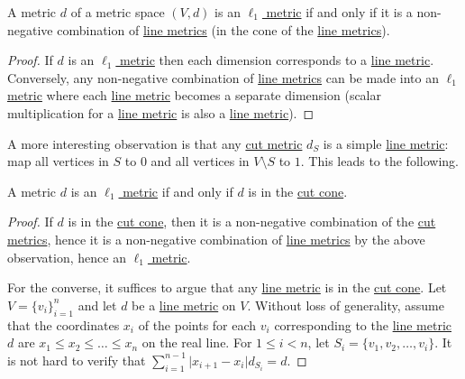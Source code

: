 \begin{lemma}\label{lma:l1-metric-iff-non-negative-combination-of-line-metric}
	A metric \(d\) of a metric space \((V, d)\) is an \hyperref[def:l1-metric]{\(\ell _1\) metric} if and only if it is a non-negative combination of \hyperref[def:line-metric]{line metrics} (in the cone of the \hyperref[def:line-metric]{line metrics}).
\end{lemma}
\begin{proof}
	If \(d\) is an \hyperref[def:l1-metric]{\(\ell _1\) metric} then each dimension corresponds to a \hyperref[def:line-metric]{line metric}. Conversely, any non-negative combination of \hyperref[def:line-metric]{line metrics} can be made into an \hyperref[def:l1-metric]{\(\ell _1\) metric} where each \hyperref[def:line-metric]{line metric} becomes a separate dimension (scalar multiplication for a \hyperref[def:line-metric]{line metric} is also a \hyperref[def:line-metric]{line metric}).
\end{proof}

A more interesting observation is that any \hyperref[def:cut-metric]{cut metric} \(d_S\) is a simple \hyperref[def:line-metric]{line metric}: map all vertices in \(S\) to \(0\) and all vertices in \(V \setminus S\) to \(1\). This leads to the following.

\begin{lemma}\label{lma:l1-metric-iff-cut-cone}
	A metric \(d\) is an \hyperref[def:l1-metric]{\(\ell _1\) metric} if and only if \(d\) is in the \hyperref[def:cut-cone]{cut cone}.
\end{lemma}
\begin{proof}
	If \(d\) is in the \hyperref[def:cut-cone]{cut cone}, then it is a non-negative combination of the \hyperref[def:cut-metric]{cut metrics}, hence it is a non-negative combination of \hyperref[def:line-metric]{line metrics} by the above observation, hence an \hyperref[def:l1-metric]{\(\ell _1\) metric}.

	For the converse, it suffices to argue that any \hyperref[def:line-metric]{line metric} is in the \hyperref[def:cut-cone]{cut cone}. Let \(V = \{ v_i \} _{i = 1}^{n}\) and let \(d\) be a \hyperref[def:line-metric]{line metric} on \(V\). Without loss of generality, assume that the coordinates \(x_i\) of the points for each \(v_i\) corresponding to the \hyperref[def:line-metric]{line metric} \(d\) are \(x_1 \leq x_2 \leq \dots \leq x_n\) on the real line. For \(1 \leq i < n\), let \(S_i = \{ v_1, v_2, \dots , v_i \} \). It is not hard to verify that \(\sum_{i=1}^{n-1} \lvert x_{i+1} - x_i \rvert d_{S_i} = d\).
\end{proof}

